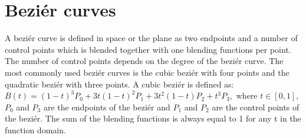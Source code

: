 \section{Beziér curves}\label{bezier}
A beziér curve is defined in space or the plane as two endpoints and a number of control points which is blended together with one blending functions per point. The number of control points depends on the degree of the beziér curve. The most commonly used beziér curves is the cubic beziér with four points and the quadratic beziér with three points. A cubic beziér is defined as:\vspace{\baselineskip}\newline
\begin{math}
	B(t) = (1 - t)^3P_0 + 3t(1 - t)^2P_1 + 3t^2(1 - t)P_2 + t^3P_3, 
\end{math} \vspace{\baselineskip}\newline
where \begin{math}t\in[0, 1], \end{math} \begin{math}P_0\end{math} and \begin{math}P_3\end{math} are the endpoints of the beziér and \begin{math}P_1\end{math} and \begin{math}P_2\end{math} are the control points of the beziér. The sum of the blending functions is always equal to 1 for any t in the function domain.\citep{PFNP}

